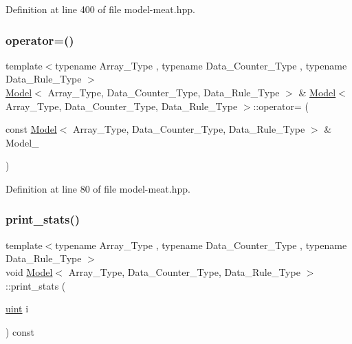 Definition at line 400 of file model-\/meat.\+hpp.

\mbox{\label{class_model_a4944b5918dc4a9a59f72587da1e6bb3a}} 
\subsubsection{\texorpdfstring{operator=()}{operator=()}}
{\footnotesize\ttfamily template$<$typename Array\+\_\+\+Type , typename Data\+\_\+\+Counter\+\_\+\+Type , typename Data\+\_\+\+Rule\+\_\+\+Type $>$ \\
\hyperlink{class_model}{Model}$<$ Array\+\_\+\+Type, Data\+\_\+\+Counter\+\_\+\+Type, Data\+\_\+\+Rule\+\_\+\+Type $>$ \& \hyperlink{class_model}{Model}$<$ Array\+\_\+\+Type, Data\+\_\+\+Counter\+\_\+\+Type, Data\+\_\+\+Rule\+\_\+\+Type $>$\+::operator= (\begin{DoxyParamCaption}\item[{const \hyperlink{class_model}{Model}$<$ Array\+\_\+\+Type, Data\+\_\+\+Counter\+\_\+\+Type, Data\+\_\+\+Rule\+\_\+\+Type $>$ \&}]{Model\+\_\+ }\end{DoxyParamCaption})\hspace{0.3cm}{\ttfamily [inline]}}



Definition at line 80 of file model-\/meat.\+hpp.

\mbox{\label{class_model_ac00b5c6a1446ad00fdf1d92c9cb1df3c}} 
\subsubsection{\texorpdfstring{print\+\_\+stats()}{print\_stats()}}
{\footnotesize\ttfamily template$<$typename Array\+\_\+\+Type , typename Data\+\_\+\+Counter\+\_\+\+Type , typename Data\+\_\+\+Rule\+\_\+\+Type $>$ \\
void \hyperlink{class_model}{Model}$<$ Array\+\_\+\+Type, Data\+\_\+\+Counter\+\_\+\+Type, Data\+\_\+\+Rule\+\_\+\+Type $>$\+::print\+\_\+stats (\begin{DoxyParamCaption}\item[{\hyperlink{typedefs_8hpp_a91ad9478d81a7aaf2593e8d9c3d06a14}{uint}}]{i }\end{DoxyParamCaption}) const\hspace{0.3cm}{\ttfamily [inline]}}



